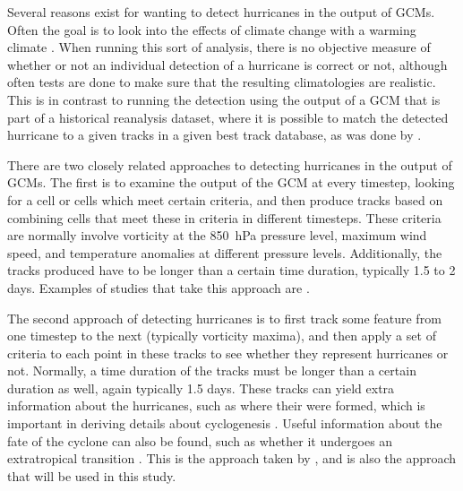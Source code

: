 \documentclass[pdftex,12pt,a4paper]{report}
\begin{document}
Several reasons exist for wanting to detect hurricanes in the output of GCMs. Often the goal is to
look into the effects of climate change with a warming climate \parencite{bengtsson1996will,
sugi2002influence, yoshimura2006influence}. When running this sort of analysis, there is no objective measure of whether or not
an individual detection of a hurricane is correct or not, although often tests are done to make sure
that the resulting climatologies are realistic. This is in contrast to running the detection using
the output of a GCM that is part of a historical reanalysis dataset, where it is possible to match
the detected hurricane to a given tracks in a given best track database, as was done by
\textcite{walsh1997objective}.

There are two closely related approaches to detecting hurricanes in the output of GCMs. The first is
to examine the output of the GCM at every timestep, looking for a cell or cells which meet certain
criteria, and then produce tracks based on combining cells that meet these in criteria in different
timesteps. These criteria are normally involve vorticity at the \SI{850}{hPa} pressure level,
maximum wind speed, and temperature anomalies at different pressure levels. Additionally, the tracks
produced have to be longer than a certain time duration, typically 1.5 to 2 days. Examples of
studies that take this approach are \textcite{bengtsson1995hurricane, walsh1997objective}.

The second approach of detecting hurricanes is to first track some feature from one timestep to the
next (typically vorticity maxima), and then apply a set of criteria to each point in these tracks to
see whether they represent hurricanes or not. Normally, a time duration of the tracks must be longer
than a certain duration as well, again typically 1.5 days. These tracks can yield extra information
about the hurricanes, such as where their were formed, which is important in deriving details about
cyclogenesis \parencite{marchok2002ncep}. Useful information about the fate of the cyclone can also
be found, such as whether it undergoes an extratropical transition \parencite{hart2001climatology,
studholme2014objective}. This is the approach taken by \textcite{hodges1994general,
hodges1999adaptive, camargo2002improving}, and is also the approach that will be used in this study.
\end{document}

